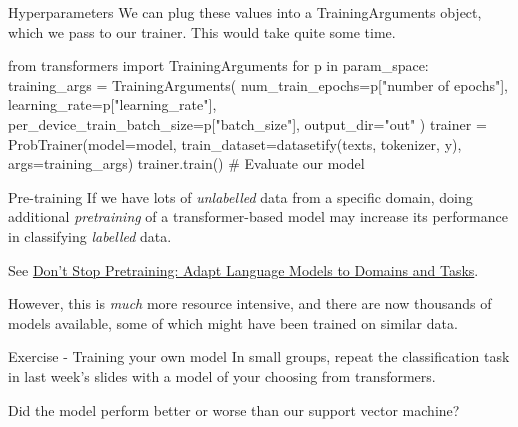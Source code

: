 \documentclass[
  10pt,
  ignorenonframetext,
  aspectratio=169]{beamer}
\newenvironment{Shaded}{\begin{snugshade}}{\end{snugshade}}
\newcommand{\CommentTok}[1]{\textcolor[rgb]{0.50,0.62,0.50}{#1}}
\newcommand{\ControlFlowTok}[1]{\textcolor[rgb]{0.94,0.87,0.69}{#1}}
\newcommand{\ImportTok}[1]{\textcolor[rgb]{0.80,0.80,0.80}{#1}}
\newcommand{\KeywordTok}[1]{\textcolor[rgb]{0.94,0.87,0.69}{#1}}
\newcommand{\NormalTok}[1]{\textcolor[rgb]{0.80,0.80,0.80}{#1}}
\newcommand{\OperatorTok}[1]{\textcolor[rgb]{0.94,0.94,0.82}{#1}}
\newcommand{\StringTok}[1]{\textcolor[rgb]{0.80,0.58,0.58}{#1}}
\begin{document}
\begin{frame}[fragile]{Hyperparameters}
\protect\hypertarget{hyperparameters-1}{}
We can plug these values into a TrainingArguments object, which we pass
to our trainer. This would take quite some time.

\medskip
\scriptsize

\begin{Shaded}
\begin{Highlighting}[]
\ImportTok{from}\NormalTok{ transformers }\ImportTok{import}\NormalTok{ TrainingArguments}
\ControlFlowTok{for}\NormalTok{ p }\KeywordTok{in}\NormalTok{ param\_space:}
\NormalTok{    training\_args }\OperatorTok{=}\NormalTok{ TrainingArguments(}
\NormalTok{        num\_train\_epochs}\OperatorTok{=}\NormalTok{p[}\StringTok{"number of epochs"}\NormalTok{],}
\NormalTok{        learning\_rate}\OperatorTok{=}\NormalTok{p[}\StringTok{"learning\_rate"}\NormalTok{],}
\NormalTok{        per\_device\_train\_batch\_size}\OperatorTok{=}\NormalTok{p[}\StringTok{"batch\_size"}\NormalTok{],}
\NormalTok{        output\_dir}\OperatorTok{=}\StringTok{"out"}
\NormalTok{    )}
\NormalTok{    trainer }\OperatorTok{=}\NormalTok{ ProbTrainer(model}\OperatorTok{=}\NormalTok{model, train\_dataset}\OperatorTok{=}\NormalTok{datasetify(texts, tokenizer, y), args}\OperatorTok{=}\NormalTok{training\_args)}
\NormalTok{    trainer.train()}
    \CommentTok{\# Evaluate our model}
\end{Highlighting}
\end{Shaded}
\end{frame}

\begin{frame}{Pre-training}
\protect\hypertarget{pre-training}{}
If we have lots of \emph{unlabelled} data from a specific domain, doing
additional \emph{pretraining} of a transformer-based model may increase
its performance in classifying \emph{labelled} data.

See \href{https://aclanthology.org/2020.acl-main.740/}{Don't Stop
Pretraining: Adapt Language Models to Domains and Tasks}.

However, this is \emph{much} more resource intensive, and there are now
thousands of models available, some of which might have been trained on
similar data.
\end{frame}

\begin{frame}{Exercise - Training your own model}
\protect\hypertarget{exercise---training-your-own-model}{}
In small groups, repeat the classification task in last week's slides
with a model of your choosing from transformers.

Did the model perform better or worse than our support vector machine?
\end{frame}
\end{document}
